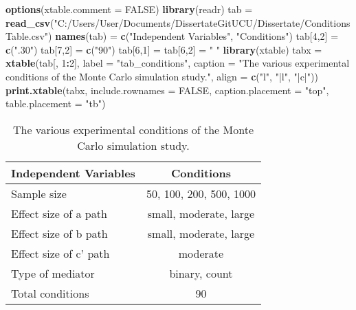 \documentclass[]{article}
\newenvironment{Shaded}{\begin{snugshade}}{\end{snugshade}}
\newcommand{\KeywordTok}[1]{\textcolor[rgb]{0.13,0.29,0.53}{\textbf{#1}}}
\newcommand{\DataTypeTok}[1]{\textcolor[rgb]{0.13,0.29,0.53}{#1}}
\newcommand{\DecValTok}[1]{\textcolor[rgb]{0.00,0.00,0.81}{#1}}
\newcommand{\StringTok}[1]{\textcolor[rgb]{0.31,0.60,0.02}{#1}}
\newcommand{\OtherTok}[1]{\textcolor[rgb]{0.56,0.35,0.01}{#1}}
\newcommand{\OperatorTok}[1]{\textcolor[rgb]{0.81,0.36,0.00}{\textbf{#1}}}
\newcommand{\NormalTok}[1]{#1}
\begin{document}
\begin{Shaded}
\begin{Highlighting}[]
\KeywordTok{options}\NormalTok{(}\DataTypeTok{xtable.comment =} \OtherTok{FALSE}\NormalTok{)}
\KeywordTok{library}\NormalTok{(readr)}
\NormalTok{tab =}\StringTok{ }\KeywordTok{read_csv}\NormalTok{(}\StringTok{"C:/Users/User/Documents/DissertateGitUCU/Dissertate/ConditionsTable.csv"}\NormalTok{)}
\KeywordTok{names}\NormalTok{(tab) =}\StringTok{ }\KeywordTok{c}\NormalTok{(}\StringTok{"Independent Variables"}\NormalTok{, }\StringTok{"Conditions"}\NormalTok{)}
\NormalTok{tab[}\DecValTok{4}\NormalTok{,}\DecValTok{2}\NormalTok{] =}\StringTok{ }\KeywordTok{c}\NormalTok{(}\StringTok{".30"}\NormalTok{)}
\NormalTok{tab[}\DecValTok{7}\NormalTok{,}\DecValTok{2}\NormalTok{] =}\StringTok{ }\KeywordTok{c}\NormalTok{(}\StringTok{"90"}\NormalTok{)}
\NormalTok{tab[}\DecValTok{6}\NormalTok{,}\DecValTok{1}\NormalTok{] =}\StringTok{ }\NormalTok{tab[}\DecValTok{6}\NormalTok{,}\DecValTok{2}\NormalTok{] =}\StringTok{ " "}
\KeywordTok{library}\NormalTok{(xtable)}
\NormalTok{tabx =}\StringTok{ }\KeywordTok{xtable}\NormalTok{(tab[, }\DecValTok{1}\OperatorTok{:}\DecValTok{2}\NormalTok{], }
       \DataTypeTok{label =} \StringTok{"tab_conditions"}\NormalTok{, }
       \DataTypeTok{caption =} \StringTok{"The various experimental conditions of the Monte Carlo simulation study."}\NormalTok{,}
       \DataTypeTok{align =} \KeywordTok{c}\NormalTok{(}\StringTok{"l"}\NormalTok{, }\StringTok{"|l"}\NormalTok{, }\StringTok{"|c|"}\NormalTok{))}
\KeywordTok{print.xtable}\NormalTok{(tabx, }\DataTypeTok{include.rownames =} \OtherTok{FALSE}\NormalTok{, }\DataTypeTok{caption.placement =} \StringTok{"top"}\NormalTok{,}
             \DataTypeTok{table.placement =} \StringTok{"tb"}\NormalTok{)}
\end{Highlighting}
\end{Shaded}

\begin{table}[tb]
\centering
\caption{The various experimental conditions of the Monte Carlo simulation study.} 
\label{tab_conditions}
\begin{tabular}{lc}
\toprule
Independent Variables & Conditions \\ 
\midrule
Sample size & 50, 100, 200, 500, 1000 \\ 
  Effect size of a path & small, moderate, large \\ 
  Effect size of b path & small, moderate, large \\ 
  Effect size of c' path & moderate \\ 
  Type of mediator & binary, count \\ 
  \midrule
  Total conditions & 90 \\ 
\bottomrule
\end{tabular}
\end{table}
\end{document}
